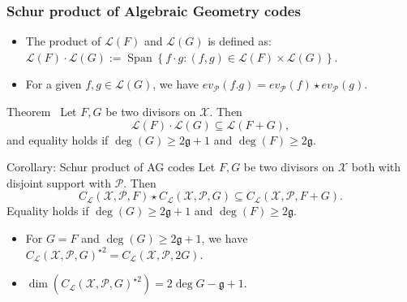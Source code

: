 \documentclass[
10pt, %
%
aspectratio=169, %
]{beamer}
\theoremstyle{plain}%
\theoremstyle{definition}
\theoremstyle{remark}
\newcommand{\calP}{\mathcal{P}}
\newcommand{\calL}{\mathcal{L}}
\newcommand{\calX}{\mathcal{X}}
\newcommand{\Span}[1]{\operatorname{Span}\left\lbrace #1\right\rbrace }
\begin{document}
\begin{frame}
	\frametitle{Schur product of Algebraic Geometry codes}
	\begin{itemize}
		\item[\textrightarrow] The product of $\calL(F)$ and $\calL(G)$ is defined as:
		$\calL(F) \cdot \calL(G) := \Span{ f \cdot g : (f,g) \in \calL(F) \times \calL(G)}$.
		\item[\textrightarrow] For a given $f,g \in \calL(G)$, we have $ev_{\calP}(f.g)=ev_{\calP}(f)\star ev_{\calP}(g)$.
	\end{itemize}
	\begin{block}{{Theorem~\cite{Mum70}}}
		Let $F,G$ be two divisors on $\calX$. Then
		\vspace{-0.9em}
		\[ \calL(F) \cdot \calL(G) \subseteq \calL(F+G),\]
		and equality holds if $\deg(G) \geq 2\mathfrak{g}+1$ and  $\deg(F) \geq 2\mathfrak{g}$.
	\end{block}
\begin{alertblock}{Corollary: Schur product of AG codes}
	Let $F,G$ be two divisors on $\calX$ both with disjoint support with $\calP$. Then
	\vspace{-0.9em}
	\[C_{\calL}(\calX,\mathcal{P},F)\star C_{\calL}(\calX,\mathcal{P},G)\subseteq C_{\calL}(\calX,\mathcal{P},F+G).\]
	Equality holds if $\deg(G) \geq 2\mathfrak{g}+1$ and  $\deg(F) \geq 2\mathfrak{g}$.
\end{alertblock}
	\begin{itemize}
		\item For $G=F$ and $\deg(G) \geq 2\mathfrak{g}+1$, we have $C_{\calL}(\calX,\mathcal{P},G)^{\star2} = C_{\calL}(\calX,\calP,2G)$.
		\item $\dim(C_{\calL}(\calX,\mathcal{P},G)^{\star2})=2\deg G - \mathfrak{g} + 1$.
	\end{itemize}
\end{frame}
\end{document}
